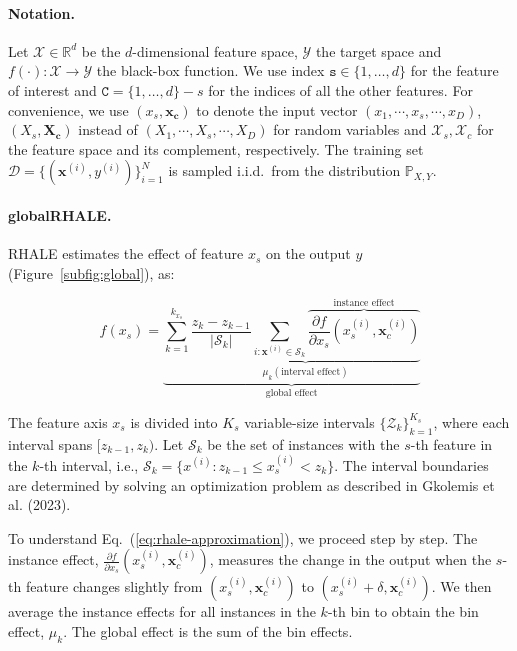 \documentclass[
twocolumn,
]{ceurart}
\newcommand{\xb}{\mathbf{x}}
\newcommand{\xc}{\mathbf{x_c}}
\newcommand{\Xc}{\mathbf{X_c}}
\newcommand{\xci}{\mathbf{x}^{(i)}_c}
\begin{document}
\paragraph{Notation.}

Let \(\mathcal{X} \in \mathbb{R}^d\) be the \(d\)-dimensional feature space, \(\mathcal{Y}\) the target space and
\(f(\cdot) : \mathcal{X} \rightarrow \mathcal{Y}\) the black-box function.
We use index \(\mathtt{s} \in \{1, \ldots, d\}\) for the feature of interest and \(\mathtt{C} = \{1, \ldots, d\} - s\) for the indices of all the other features.
For convenience, we use \((x_s, \xc)\) to denote the input vector \((x_1, \cdots , x_s, \cdots, x_D)\),
\((X_s, \Xc)\) instead of \((X_1, \cdots , X_s, \cdots, X_D)\) for random variables and
$\mathcal{X}_s, \mathcal{X}_{c}$ for the feature space and its complement, respectively.
The training set \(\mathcal{D} = \{(\xb^{(i)}, y^{(i)})\}_{i=1}^N\) is sampled
i.i.d.\ from the distribution \(\mathbb{P}_{X,Y}\).

\paragraph{globalRHALE.}

RHALE estimates the effect of feature $x_s$ on the output $y$ (Figure~\ref{subfig:global}), as:

\begin{equation}
  \label{eq:rhale-approximation}
f(x_s) = \underbrace{\sum_{k=1}^{k_{x_s}} \underbrace{\frac{z_k - z_{k-1}}{ \left | \mathcal{S}_k \right |} \sum_{i: \xb^{(i)} \in \mathcal{S}_k} \overbrace{\frac{\partial f}{\partial x_s} (x_s^{(i)}, \xci)}^{\text{instance effect}}}_{\mu_k (\text{interval effect})}}_{\text{global effect}}
\end{equation}

\noindent
The feature axis $x_s$ is divided into $K_s$ variable-size intervals $\{\mathcal{Z}_k\}_{k=1}^{K_s}$, where each interval spans $[z_{k-1}, z_k)$. Let $\mathcal{S}_k$ be the set of instances with the $s$-th feature in the $k$-th interval, i.e., $\mathcal{S}_k = \{ x^{(i)} : z_{k-1} \leq x^{(i)}_s < z_k \}$. The interval boundaries are determined by solving an optimization problem as described in Gkolemis et al. (2023).

To understand Eq.~(\ref{eq:rhale-approximation}), we proceed step by step. The instance effect, $\frac{\partial f}{\partial x_s} (x_s^{(i)}, \xci)$, measures the change in the output when the $s$-th feature changes slightly from $(x_s^{(i)}, \xci)$ to $(x_s^{(i)} + \delta, \xci)$. We then average the instance effects for all instances in the $k$-th bin to obtain the bin effect, $\mu_k$. The global effect is the sum of the bin effects.
\end{document}
